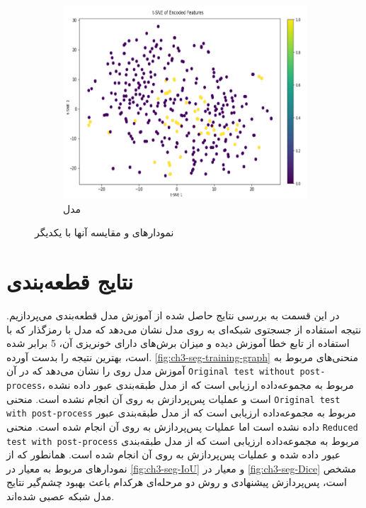 \begin{figure}[h!]
\begin{subfigure}{0.33\textwidth}
			\includegraphics[width=\linewidth]{Images/Chapter3/tsne-other.png}
			\caption{مدل  
			\cite{Ganeshkumar2022Identification}}
			\label{fig:ch3-tsne-other}
        \end{subfigure}
		\caption{نمودارهای 
		و مقایسه آنها با یکدیگر}
		\label{fig:ch3-tsne}
\end{figure}


\section{نتایج قطعه‌بندی}
در این قسمت به بررسی نتایج حاصل شده از آموزش مدل قطعه‌بندی 
 می‌پردازیم. نتیجه استفاده از جسجتوی شبکه‌ای به روی مدل 
 نشان می‌دهد که مدل با رمزگذار 
که با استفاده از تابع خطا
آموزش دیده و میزان برش‌های دارای خونریزی آن، 5 برابر شده است، بهترین نتیجه را بدست آورده‌.
 \autoref{fig:ch3-seg-training-graph}
 منحنی‌های مربوط به آموزش مدل روی 
را نشان می‌دهد که در آن 
 \texttt{Original test without post-process}،
 مربوط به مجموعه‌داده ارزیابی است که از مدل طبقه‌بندی عبور داده نشده است و عملیات پس‌پردازش به روی آن انجام نشده است.
 منحنی 
 \texttt{Original test with post-process}
 مربوط به مجموعه‌داده ارزیابی است که از مدل طبقه‌بندی عبور داده نشده‌ است اما عملیات پس‌پردازش به روی آن انجام شده است.
منحنی 
 \texttt{Reduced test with post-process}
 مربوط به مجموعه‌داده ارزیابی است که از مدل طبقه‌بندی عبور داده شده و عملیات پس‌پردازش به روی آن انجام شده است.
 همانطور که از نمودارهای مربوط به معیار
 در 
 \autoref{fig:ch3-seg-IoU}
 و معیار 
  در 
  \autoref{fig:ch3-seg-Dice}
  مشخص است،‌ پس‌پردازش پیشنهادی و روش دو مرحله‌ای هرکدام باعث بهبود چشم‌گیر نتایج مدل شبکه عصبی شده‌اند.
 
